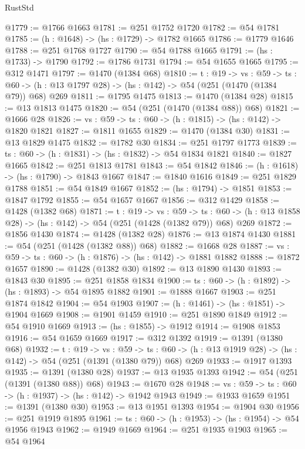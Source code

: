 \begin{lexlean}{RustStd}
\begin{coremodule}
{\begin{coremodule}
{{{{@1779 := @1766 @1663
@1781 := @251 @1752 @1720
@1782 := @54 @1781
@1785 := (h : @1648) -> (hs : @1729) -> @1782 @1665
@1786 := @1779 @1646
@1788 := @251 @1768 @1727
@1790 := @54 @1788 @1665
@1791 := (hs : @1733) -> @1790
@1792 := @1786 @1731
@1794 := @54 @1655 @1665
@1795 := @312 @1471
@1797 := @1470 (@1384 @68)
@1810 := {t : @19} ->
  {vs : @59} ->
  {ts : @60} -> (h : @13 @1797 @28) -> (hs : @142) -> @54 (@251 (@1470 (@1384 @79)) @68) @269
@1811 := @1795 @1475
@1813 := @1470 (@1384 @28)
@1815 := @13 @1813 @1475
@1820 := @54 (@251 (@1470 (@1384 @88)) @68)
@1821 := @1666 @28
@1826 := {vs : @59} -> {ts : @60} -> (h : @1815) -> (hs : @142) -> @1820 @1821
@1827 := @1811 @1655
@1829 := @1470 (@1384 @30)
@1831 := @13 @1829 @1475
@1832 := @1782 @30
@1834 := @251 @1797 @1773
@1839 := {ts : @60} -> (h : @1831) -> (hs : @1832) -> @54 @1834 @1821
@1840 := @1827 @1665
@1842 := @251 @1813 @1781
@1843 := @54 @1842
@1846 := (h : @1618) -> (hs : @1790) -> @1843 @1667
@1847 := @1840 @1616
@1849 := @251 @1829 @1788
@1851 := @54 @1849 @1667
@1852 := (hs : @1794) -> @1851
@1853 := @1847 @1792
@1855 := @54 @1657 @1667
@1856 := @312 @1429
@1858 := @1428 (@1382 @68)
@1871 := {t : @19} ->
  {vs : @59} ->
  {ts : @60} -> (h : @13 @1858 @28) -> (hs : @142) -> @54 (@251 (@1428 (@1382 @79)) @68) @269
@1872 := @1856 @1430
@1874 := @1428 (@1382 @28)
@1876 := @13 @1874 @1430
@1881 := @54 (@251 (@1428 (@1382 @88)) @68)
@1882 := @1668 @28
@1887 := {vs : @59} -> {ts : @60} -> (h : @1876) -> (hs : @142) -> @1881 @1882
@1888 := @1872 @1657
@1890 := @1428 (@1382 @30)
@1892 := @13 @1890 @1430
@1893 := @1843 @30
@1895 := @251 @1858 @1834
@1900 := {ts : @60} -> (h : @1892) -> (hs : @1893) -> @54 @1895 @1882
@1901 := @1888 @1667
@1903 := @251 @1874 @1842
@1904 := @54 @1903
@1907 := (h : @1461) -> (hs : @1851) -> @1904 @1669
@1908 := @1901 @1459
@1910 := @251 @1890 @1849
@1912 := @54 @1910 @1669
@1913 := (hs : @1855) -> @1912
@1914 := @1908 @1853
@1916 := @54 @1659 @1669
@1917 := @312 @1392
@1919 := @1391 (@1380 @68)
@1932 := {t : @19} ->
  {vs : @59} ->
  {ts : @60} -> (h : @13 @1919 @28) -> (hs : @142) -> @54 (@251 (@1391 (@1380 @79)) @68) @269
@1933 := @1917 @1393
@1935 := @1391 (@1380 @28)
@1937 := @13 @1935 @1393
@1942 := @54 (@251 (@1391 (@1380 @88)) @68)
@1943 := @1670 @28
@1948 := {vs : @59} -> {ts : @60} -> (h : @1937) -> (hs : @142) -> @1942 @1943
@1949 := @1933 @1659
@1951 := @1391 (@1380 @30)
@1953 := @13 @1951 @1393
@1954 := @1904 @30
@1956 := @251 @1919 @1895
@1961 := {ts : @60} -> (h : @1953) -> (hs : @1954) -> @54 @1956 @1943
@1962 := @1949 @1669
@1964 := @251 @1935 @1903
@1965 := @54 @1964
}}}}
\end{coremodule}}
\end{coremodule}
\end{lexlean}
